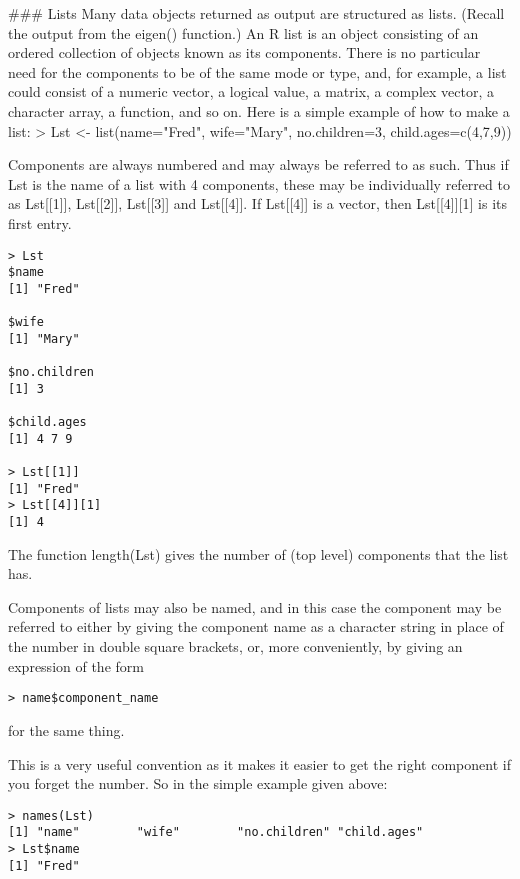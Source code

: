 
### Lists
Many data objects returned as output are structured as lists.
(Recall the output from the eigen() function.)
An  R list is an object consisting of an ordered collection of objects known as its components.
There is no particular need for the components to be of the same mode or type, and, for example, a list could consist of a numeric vector, a logical value, a matrix, a complex vector, a character array, a function, and so on.
Here is a simple example of how to make a list:
> Lst <- list(name="Fred", wife="Mary", no.children=3,                   child.ages=c(4,7,9))


Components are always numbered and may always be referred to as such.
Thus if Lst is the name of a list with 4 components, these may be individually referred to as Lst[[1]], Lst[[2]], Lst[[3]] and Lst[[4]].
If Lst[[4]] is a vector, then Lst[[4]][1] is its first entry.

\begin{verbatim}
> Lst
$name
[1] "Fred"

$wife
[1] "Mary"

$no.children
[1] 3

$child.ages
[1] 4 7 9

> Lst[[1]]
[1] "Fred"
> Lst[[4]][1]
[1] 4
\end{verbatim}




The function length(Lst) gives the number of (top level) components that the list has.

Components of lists may also be named, and in this case the component may be referred to either by giving the component name as a character string in place of the number in double square brackets, or, more conveniently, by giving an expression of the form

\begin{verbatim}
> name$component_name
\end{verbatim}

for the same thing.

This is a very useful convention as it makes it easier to get the right component if you forget the number. 
So in the simple example given above:

\begin{verbatim}
> names(Lst)
[1] "name"        "wife"        "no.children" "child.ages"
> Lst$name
[1] "Fred"
\end{verbatim}
